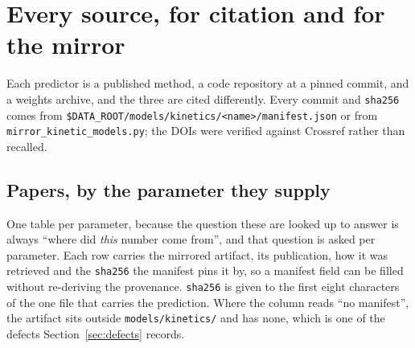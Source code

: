 
\section{Every source, for citation and for the mirror}
\label{sec:sources}

Each predictor is a published method, a code repository at a pinned commit, and a weights
archive, and the three are cited differently. Every commit and \texttt{sha256} comes from
\texttt{\$DATA\_ROOT/models/kinetics/<name>/manifest.json} or from
\texttt{mirror\_kinetic\_models.py}; the DOIs were verified against Crossref rather than
recalled.

\subsection{Papers, by the parameter they supply}

One table per parameter, because the question these are looked up to answer is always
``where did \emph{this} number come from'', and that question is asked per parameter. Each
row carries the mirrored artifact, its publication, how it was retrieved and the
\texttt{sha256} the manifest pins it by, so a manifest field can be filled without
re-deriving the provenance. \texttt{sha256} is given to the first eight characters of the
one file that carries the prediction. Where the column reads ``no manifest'', the artifact
sits outside \texttt{models/kinetics/} and has none, which is one of the defects
Section~\ref{sec:defects} records.

